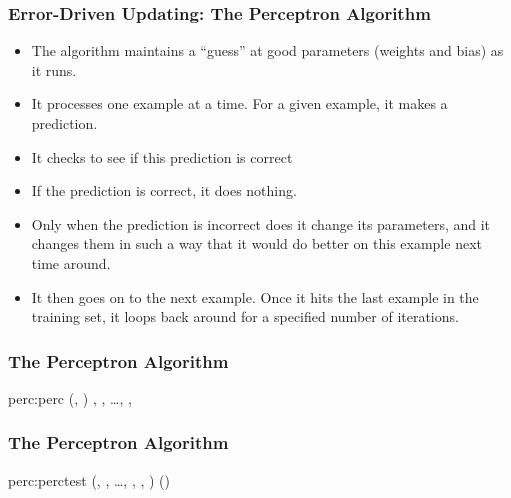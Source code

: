 \documentclass[trans]{beamer}
\begin{document}
\begin{frame}
  \frametitle{Error-Driven Updating: The Perceptron Algorithm}
\begin{itemize}
\item
The algorithm maintains a ``guess'' at good parameters (weights and
bias) as it runs.
\item   It processes one example at a time.  For a given
example, it makes a prediction. 
\item It checks to see if this prediction
is correct 
\item  If the prediction is correct, it does
nothing. 
\item Only when the prediction is incorrect does it change its
parameters, and it changes them in such a way that it would do better
on this example next time around.  
\item It then goes on to the next
example.  Once it hits the last example in the training set, it loops
back around for a specified number of iterations.
\end{itemize}
\end{frame}

\begin{frame}
  \frametitle{The Perceptron Algorithm}

\newalgorithm%
  {perc:perc}%
  {(, )}
  {
\ENDIF
\ENDFOR
\ENDFOR
\RETURN {}, , \dots, , 
}
\end{frame}

\begin{frame}
  \frametitle{The Perceptron Algorithm}
\newalgorithm%
  {perc:perctest}%
  {(, , \dots, , , \VAR{$\hat\vx$})}
  {
\RETURN {}()
}
\end{frame}
\end{document}

